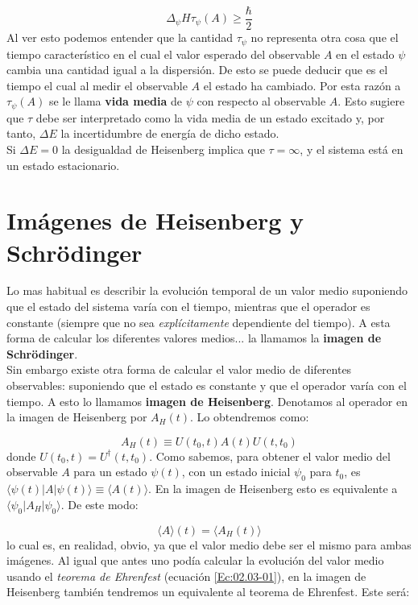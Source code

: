 \documentclass[12pt,a4paper]{book}
\numberwithin{equation}{chapter}
\numberwithin{figure}{chapter}
\begin{document}
\begin{equation}
\Delta_\psi H \tau_\psi (A) \geq \frac{\hbar}{2}
\end{equation}
Al ver esto podemos entender que la cantidad $\tau_\psi$ no representa otra cosa que el tiempo característico en el cual el valor esperado del observable $A$ en el estado $\psi$ cambia una cantidad igual a la dispersión. De esto se puede deducir que es el tiempo el cual al medir el observable $A$ el estado ha cambiado. Por esta razón a $\tau_\psi (A)$ se le llama \textbf{vida media} de $\psi$ con respecto al observable $A$. Esto sugiere que $\tau$ debe ser interpretado como la vida media de un estado excitado y, por tanto, $\Delta E$ la incertidumbre de energía de dicho estado. \\

Si $\Delta E =0$ la desigualdad de Heisenberg implica que $\tau = \infty$, y el sistema está en un estado estacionario. \\

\section{Imágenes de Heisenberg y Schrödinger}

Lo mas habitual es describir la evolución temporal de un valor medio suponiendo que el estado del sistema varía con el tiempo, mientras que el operador es constante (siempre que no sea \textit{explícitamente} dependiente del tiempo). A esta forma de calcular los diferentes valores medios... la llamamos la \textbf{imagen de Schrödinger}. \\

Sin embargo existe otra forma de calcular el valor medio de diferentes observables: suponiendo que el estado es constante y que el operador varía con el tiempo. A esto lo llamamos \textbf{imagen de Heisenberg}. Denotamos al operador en la imagen de Heisenberg por $A_H (t)$. Lo obtendremos como:

\begin{equation}
A_H (t) \equiv U (t_0,t) A (t) U(t,t_0) 
\end{equation}
donde $U(t_0,t) = U^\dagger (t,t_0)$. Como sabemos, para obtener el valor medio del observable $A$ para un estado $\psi (t)$, con un estado inicial $\psi_0$ para $t_0$, es  $\langle \psi (t) | A | \psi (t) \rangle  \equiv \langle A (t) \rangle $. En la imagen de Heisenberg esto es equivalente a  $\langle \psi_0 | A_H | \psi_0 \rangle $. De este modo:

\begin{equation}
\langle A \rangle (t) = \langle A_H (t) \rangle
\end{equation}
lo cual es, en realidad, obvio, ya que el valor medio debe ser el mismo para ambas imágenes. Al igual que antes uno podía calcular la evolución del valor medio usando el \textit{teorema de Ehrenfest} (ecuación  \ref{Ec:02.03-01}), en la imagen de Heisenberg también tendremos un equivalente al teorema de Ehrenfest. Este será:
\end{document}
